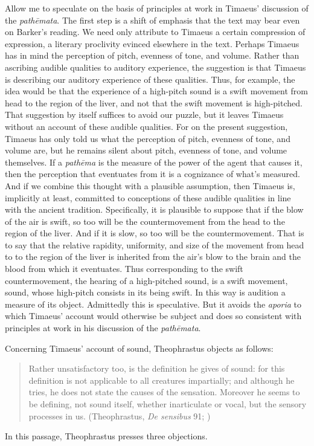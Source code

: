 Allow me to speculate on the basis of principles at work in Timaeus' discussion of the \emph{pathēmata}. The first step is a shift of emphasis that the text may bear even on Barker's reading. We need only attribute to Timaeus a certain compression of expression, a literary proclivity evinced elsewhere in the text. Perhaps Timaeus has in mind the perception of pitch, evenness of tone, and volume. Rather than ascribing audible qualities to auditory experience, the suggestion is that Timaeus is describing our auditory experience of these qualities. Thus, for example, the idea would be that the experience of a high-pitch sound is a swift movement from head to the region of the liver, and not that the swift movement is high-pitched. That suggestion by itself suffices to avoid our puzzle, but it leaves Timaeus without an account of these audible qualities. For on the present suggestion, Timaeus has only told us what the perception of pitch, evenness of tone, and volume are, but he remains silent about pitch, evenness of tone, and volume themselves. If a \emph{pathēma} is the measure of the power of the agent that causes it, then the perception that eventuates from it is a cognizance of what's measured. And if we combine this thought with a plausible assumption, then Timaeus is, implicitly at least, committed to conceptions of these audible qualities in line with the ancient tradition. Specifically, it is plausible to suppose that if the blow of the air is swift, so too will be the countermovement from the head to the region of the liver. And if it is slow, so too will be the countermovement. That is to say that the relative rapidity, uniformity, and size of the movement from head to to the region of the liver is inherited from the air's blow to the brain and the blood from which it eventuates. Thus corresponding to the swift countermovement, the hearing of a high-pitched sound, is a swift movement, sound, whose high-pitch consists in its being swift. In this way is audition a measure of its object. Admittedly this is speculative. But it avoids the \emph{aporia} to which Timaeus' account would otherwise be subject and does so consistent with principles at work in his discussion of the \emph{pathēmata}. 

Concerning Timaeus' account of sound, Theophrastus objects as follows:
\begin{quote}
	Rather unsatisfactory too, is the definition he gives of sound: for this definition is not applicable to all creatures impartially; and although he tries, he does not state the causes of the sensation. Moreover he seems to be defining, not sound itself, whether inarticulate or vocal, but the sensory processes in us. (Theophrastus, \emph{De sensibus} 91; \citealt[149]{Stratton:1917vn})
\end{quote}
In this passage, Theophrastus presses three objections. 

